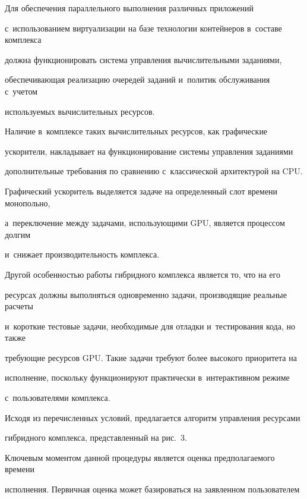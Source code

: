        Для обеспечения параллельного выполнения различных приложений 

с~использованием виртуализации на базе технологии контейнеров в~составе комплекса 

должна функционировать система управления вычислительными заданиями, 

обеспечивающая реализацию очередей заданий и~политик обслуживания с~учетом 

используемых вычислительных ресурсов. 

      

      Наличие в~комплексе таких вычислительных ресурсов, как графические 

ускорители, накладывает на функционирование системы управления заданиями 

дополнительные требования по сравнению с~классической архитектурой на CPU. 

Графический ускоритель выделяется задаче на определенный слот времени монопольно, 

а~переключение между задачами, использующими GPU, является процессом долгим 

и~снижает производительность комплекса. 

      

      Другой особенностью работы гибридного комплекса является то, что на его 

ресурсах должны выполняться одновременно задачи, производящие реальные расчеты 

и~короткие тестовые задачи, необходимые для отладки и~тестирования кода, но также 

требующие ресурсов GPU. Такие задачи требуют более высокого приоритета на 

исполнение, поскольку функционируют практически в~интерактивном режиме 

с~пользователями комплекса.

      

      Исходя из перечисленных условий, предлагается алгоритм управления ресурсами 

гибридного комплекса, представленный на рис.~3.

      





      Ключевым моментом данной процедуры является оценка предполагаемого времени 

исполнения. Первичная оценка может базироваться на заявленном пользователем 


